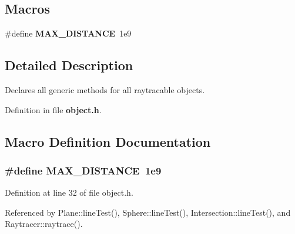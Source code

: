 \subsection*{Macros}
\begin{DoxyCompactItemize}
\item 
\#define {\bf M\+A\+X\+\_\+\+D\+I\+S\+T\+A\+N\+C\+E}~1e9
\end{DoxyCompactItemize}


\subsection{Detailed Description}
Declares all generic methods for all raytracable objects. 



Definition in file {\bf object.\+h}.



\subsection{Macro Definition Documentation}
\subsubsection[{M\+A\+X\+\_\+\+D\+I\+S\+T\+A\+N\+C\+E}]{\setlength{\rightskip}{0pt plus 5cm}\#define M\+A\+X\+\_\+\+D\+I\+S\+T\+A\+N\+C\+E~1e9}\label{object_8h_a08e4da5f3d0c7936fa52467f40e4b6aa}


Definition at line 32 of file object.\+h.



Referenced by Plane\+::line\+Test(), Sphere\+::line\+Test(), Intersection\+::line\+Test(), and Raytracer\+::raytrace().

